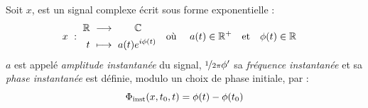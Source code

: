 \begin{definition} \label{def:param_instant}
	Soit $x$, est un signal complexe écrit sous forme exponentielle :
	\begin{align}
		x\ &:\ \begin{aligned}\mathbb{R}\ &\longrightarrow\qquad \mathbb{C} \\
			t\ &\longmapsto\ a(t)e^{i\phi(t)}
		\end{aligned}  &  \text{où }\quad a(t)\in\mathbb{R}^+\quad &\text{et}\quad \phi(t)\in\mathbb{R}
	\end{align}
	$a$ est appelé \emph{amplitude instantanée} du signal, $\nicefrac{1}{2\pi}\phi'$ sa \emph{fréquence instantanée} et sa \emph{phase instantanée} est définie, modulo un choix de phase initiale, par :
	\begin{equation} \label{eq:phasei}
		\Phi_{\text{\normalfont inst}}(x,t_0,t) = \phi(t) - \phi(t_0)
	\end{equation}
\end{definition}
\skipl 

